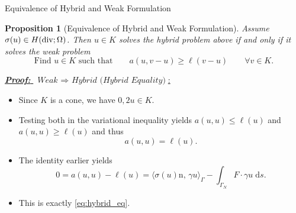 \documentclass[10pt,aspectratio=169]{beamer}
\newtheorem{proposition}{Proposition}[section]
\def\d{{\mathrm{d}}}
\def\ds{{\d s}}
\newcommand{\diver}{\operatornamewithlimits{div}}
\begin{document}
\begin{frame}{Equivalence of Hybrid and Weak Formulation}
	\begin{proposition}[Equivalence of Hybrid and Weak Formulation]
		Assume $\sigma(u)\in H(\diver;\Omega)$. Then $u\in K$ solves the hybrid problem above if and only if it solves the weak problem
		\begin{equation*}
			\text{Find }u\in K\text{ such that}\qquad a(u,v-u)\ge\ell(v-u)\qquad \forall v\in K.
		\end{equation*}
	\end{proposition}
	\underline{\textbf{\em Proof:} $\ \textit{Weak }\Rightarrow\textit{ Hybrid (Hybrid Equality)}$:}
	\begin{itemize}
		\item Since $K$ is a cone, we have $0,2u\in K$.
		\item Testing both in the variational inequality yields $a(u,u)\le \ell(u)$ and $a(u,u)\ge \ell(u)$ and thus
		      \begin{equation*}
			      a(u,u)= \ell(u).
		      \end{equation*}
		\item The identity earlier yields
		      \begin{equation*}
			      0 = a(u,u)-\ell(u) = \langle\sigma(u)\mathrm{n},\,\gamma u\rangle_\Gamma -\int_{\Gamma_N}F\cdot\gamma u\;\ds.
		      \end{equation*}
		\item This is exactly \eqref{eq:hybrid_eq}.
	\end{itemize}
\end{frame}
\end{document}
